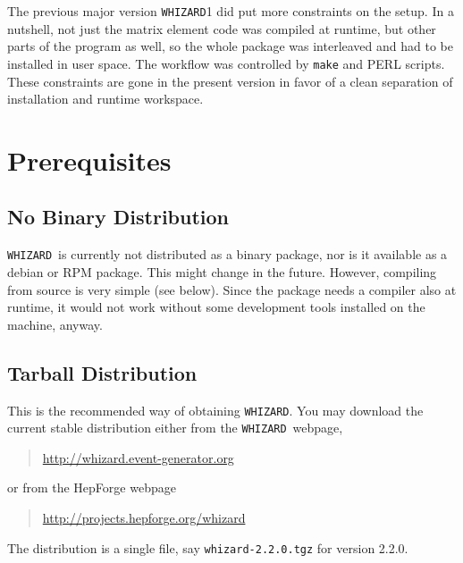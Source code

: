 \documentclass[12pt]{book}
\newcommand{\whizardpage}{\url{http://whizard.event-generator.org}}
\newcommand{\hepforgepage}{\url{http://projects.hepforge.org/whizard}}
\newcommand{\ttt}[1]{\texttt{#1}}
\newcommand{\whizard}{\texttt{WHIZARD}}
\newcommand{\thisversion}{2.2.0}
\begin{document}
The previous major version \whizard1 did put more constraints on the
setup.  In a nutshell, not just the matrix element code was compiled
at runtime, but other parts of the program as well, so the whole
package was interleaved and had to be installed in user space.  The
workflow was controlled by \ttt{make} and PERL scripts.  These
constraints are gone in the present version in favor of a clean
separation of installation and runtime workspace.


\section{\label{sec:prerequisites}Prerequisites}

\subsection{No Binary Distribution}

\whizard\ is currently not distributed as a binary package, nor is it
available as a debian or RPM package.  This might change in the
future.  However, compiling from source is very simple (see below).
Since the package needs a compiler also at runtime, it would not work
without some development tools installed on the machine, anyway.


\subsection{Tarball Distribution}

This is the recommended way of obtaining \whizard.  You may download
the current stable distribution either from the \whizard\ webpage, 
\begin{quote}
  \whizardpage
\end{quote}
or from the HepForge webpage
\begin{quote}
  \hepforgepage
\end{quote}
The distribution is a single file, say \ttt{whizard-\thisversion.tgz} for
version \thisversion.
\end{document}
